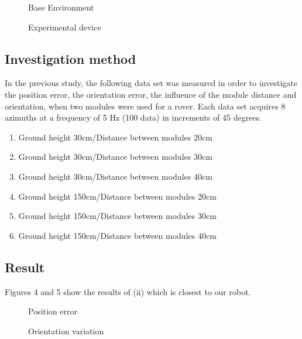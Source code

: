 \documentclass[a4paper]{article}
\begin{document}
\begin{figure}[H]
    \centerline{}
    \caption{Base Environment}
\end{figure}
\begin{figure}[H]
    \centerline{}
    \caption{Experimental device}
\end{figure}

\subsection{Investigation method}
In the previous study, the following data set was measured in order to 
investigate the position error, the orientation error, 
the influence of the module distance and orientation, when two modules were used for a rover.
Each data set acquires 8 azimuths at a frequency of 5 Hz (100 data) in increments of 45 degrees.
\begin{enumerate}
    \renewcommand{\labelenumi}{(\roman{enumi})}
    \item Ground height 30cm/Distance between modules 20cm
    \item Ground height 30cm/Distance between modules 30cm
    \item Ground height 30cm/Distance between modules 40cm
    \item Ground height 150cm/Distance between modules 20cm
    \item Ground height 150cm/Distance between modules 30cm
    \item Ground height 150cm/Distance between modules 40cm
\end{enumerate}

\subsection{Result}
Figures 4 and 5 show the results of (ii) which is closest to our robot.

\begin{figure}[H]
    \centerline{}
    \caption{Position error}
\end{figure}
\begin{figure}[H]
    \centerline{}
    \caption{Orientation variation}
\end{figure}
\end{document}
